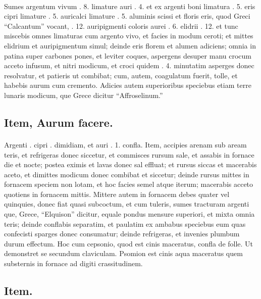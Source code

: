 \documentclass[a4paper, 11pt, oneside, polutonikogreek, italian]{article}
\begin{document}
\paragraph{}
Sumes argentum vivum \roundz. 8. limature auri \roundz. 4. et ex argenti boni limatura \roundz. 5. eris cipri limature \roundz. 5. auricalci limature \roundz. 5. aluminis scissi et floris eris, quod Greci ``Calcantum'' vocant, \roundz. 12. auripigmenti coloris aurei \roundz. 6. elidrii \roundz. 12. et tunc miscebis omnes limaturas cum argento vivo, et facies in modum ceroti; et mittes elidrium et auripigmentum simul; deinde eris florem et alumen adiciens; omnia in patina super carbones pones, et leviter coques, aspergens desuper manu crocum acceto infusum, et nitri modicum, et croci quidem \roundz. 4. minutatim asperges donec resolvatur, et patieris ut combibat; cum, autem, coagulatum fuerit, tolle, et habebis aurum cum cremento. Adicies autem superioribus speciebus etiam terre lunaris modicum, que Grece dicitur ``Affroselinum.''

\subsection{Item, Aurum facere.}
\paragraph{}
Argenti \roundz. cipri \roundz. dimidiam, et auri \roundz. 1. confla. Item, accipies arenam sub aream teris, et refrigeras donec siccetur, et commisces rursum sale, et assabis in fornace die et nocte; postea eximis et lavas donec sal effluat; et rursus siccas et macerabis aceto, et dimittes modicum donec combibat et siccetur; deinde rursus mittes in fornacem speciem non lotam, et hoc facies semel atque iterum; macerabis acceto quotiens in fornacem mittis. Mittere autem in fornacem debes quater vel quinquies, donec fiat quasi subcoctum, et cum tuleris, sumes tracturam argenti que, Grece, ``Elquison'' dicitur, equale pondus mensure superiori, et mixta omnia teris; deinde conflabis separatim, et paulatim ex ambabus speciebus eum quas confecisti sparges donec consumatur; deinde refrigeras, et invenies plumbum durum effectum. Hoc cum cepsonio, quod est cinis maceratus, confla de folle. Ut demonstret se secundum claviculam. Psomion est cinis aqua maceratus quem substernis in fornace ad digiti crassitudinem.

\subsection{Item.}
\end{document}
